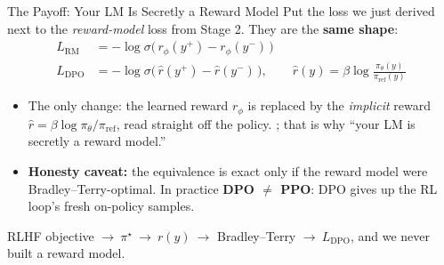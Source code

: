 \begin{frame}{The Payoff: Your LM Is Secretly a Reward Model}
Put the loss we just derived next to the \emph{reward-model} loss from Stage 2. They are the \textbf{same shape}:
\begin{align*}
    L_{\mathrm{RM}}  &= -\log\sigma\big(\, r_\phi(y^+) - r_\phi(y^-) \, \big) \\[0.3em]
    L_{\mathrm{DPO}} &= -\log\sigma\big(\, \hat{r}(y^+) - \hat{r}(y^-) \, \big),
        \qquad \hat{r}(y) = \beta \log\frac{\pi_\theta(y)}{\pi_{\text{ref}}(y)}
\end{align*}
\begin{itemize}\itemsep0.25em\small
    \item The only change: the learned reward $r_\phi$ is replaced by the
          \emph{implicit} reward $\hat{r} = \beta\log\pi_\theta/\pi_{\text{ref}}$,
          read straight off the policy. ; that is why ``your LM is secretly a reward model.''
    \item \textbf{Honesty caveat:} the equivalence is exact only if the reward model
          were Bradley--Terry-optimal. In practice \textbf{DPO $\neq$ PPO}: DPO
          gives up the RL loop's fresh on-policy samples.
\end{itemize}
\vspace{0.2em}
\begin{center}
\setlength{\fboxsep}{6pt}%
\colorbox{boxgreen!50}{\parbox{0.9\textwidth}{\centering\small
RLHF objective $\to\ \pi^\star\ \to\ r(y)\ \to$ Bradley--Terry $\to\ L_{\mathrm{DPO}}$,
and we never built a reward model. }}
\end{center}
\end{frame}

